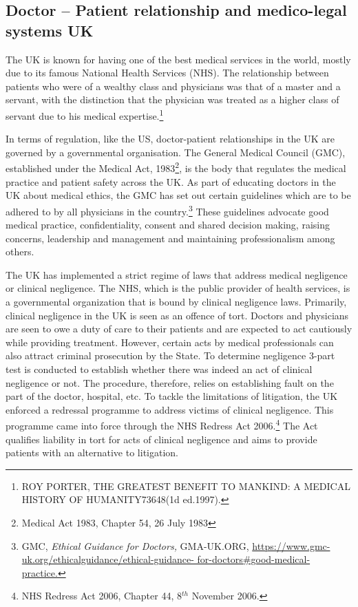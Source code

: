\begin{multicols}{2}
\vspace{-.3cm}

\subsection*{Doctor – Patient relationship and medico-legal systems UK}

\vspace{-.2cm}

\noi
The UK is known for having one of the best medical services in the world, mostly due to its famous National Health Services (NHS). The relationship between patients who were of a wealthy class and physicians was that of a master and a servant, with the distinction that the physician was treated as a higher class of servant due to his medical
expertise.\footnote{ROY PORTER, THE GREATEST BENEFIT TO MANKIND: A MEDICAL HISTORY OF HUMANITY73648(1d ed.1997).}

\noi
In terms of regulation, like the US, doctor-patient relationships in the UK are governed
by a governmental organisation. The General Medical Council (GMC), established
under the Medical Act, 1983\footnote{Medical Act 1983, Chapter 54, 26 July 1983}, is the body that regulates the medical practice and patient safety across the UK. As part of educating doctors in the UK about medical ethics, the GMC has set out certain guidelines which are to be adhered to by all physicians in the country.\footnote{GMC, \textit{Ethical Guidance for Doctors,} GMA-UK.ORG, \url{https://www.gmc-uk.org/ethicalguidance/ethical-guidance- for-doctors#good-medical-practice.}} These guidelines advocate good medical practice, confidentiality, consent and shared decision making, raising concerns, leadership and management and maintaining professionalism among others.

\noi
The UK has implemented a strict regime of laws that address medical negligence or
clinical negligence. The NHS, which is the public provider of health services, is a
governmental organization that is bound by clinical negligence laws. Primarily, clinical
negligence in the UK is seen as an offence of tort. Doctors and physicians are seen to
owe a duty of care to their patients and are expected to act cautiously while providing
treatment. However, certain acts by medical professionals can also attract criminal
prosecution by the State. To determine negligence 3-part test is conducted to establish
whether there was indeed an act of clinical negligence or not. The procedure, therefore,
relies on establishing fault on the part of the doctor, hospital, etc. To tackle the
limitations of litigation, the UK enforced a redressal programme to address victims of
clinical negligence. This programme came into force through the NHS Redress Act 2006.\footnote{NHS Redress Act 2006, Chapter 44, 8$^{th}$ November 2006.} The Act qualifies liability in tort for acts of clinical negligence and aims to provide patients with an alternative to litigation.


\end{multicols}
